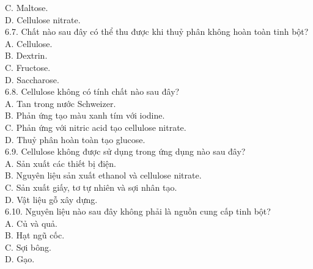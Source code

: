 \documentclass[10pt]{article}
\begin{document}
C. Maltose.\\
D. Cellulose nitrate.\\
6.7. Chất nào sau đây có thể thu được khi thuỷ phân không hoàn toàn tinh bột?\\
A. Cellulose.\\
B. Dextrin.\\
C. Fructose.\\
D. Saccharose.\\
6.8. Cellulose không có tính chất nào sau đây?\\
A. Tan trong nước Schweizer.\\
B. Phản ứng tạo màu xanh tím với iodine.\\
C. Phản ứng với nitric acid tạo cellulose nitrate.\\
D. Thuỷ phân hoàn toàn tạo glucose.\\
6.9. Cellulose không được sử dụng trong ứng dụng nào sau đây?\\
A. Sản xuất các thiết bị điện.\\
B. Nguyên liệu sản xuất ethanol và cellulose nitrate.\\
C. Sản xuất giấy, tơ tự nhiên và sợi nhân tạo.\\
D. Vật liệu gỗ xây dựng.\\
6.10. Nguyên liệu nào sau đây không phải là nguồn cung cấp tinh bột?\\
A. Củ và quả.\\
B. Hạt ngũ cốc.\\
C. Sợi bông.\\
D. Gạo.
\end{document}
